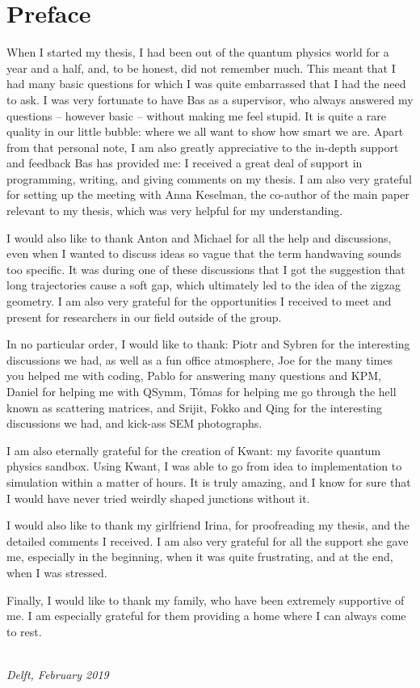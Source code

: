 \chapter*{Preface}

When I started my thesis, I had been out of the quantum physics world for a year and a half, and, to be honest, did not remember much.
This meant that I had many basic questions for which I was quite embarrassed that I had the need to ask.
I was very fortunate to have Bas as a supervisor, who always answered my questions -- however basic -- without making me feel stupid.
It is quite a rare quality in our little bubble: where we all want to show how smart we are.
Apart from that personal note, I am also greatly appreciative to the in-depth support and feedback Bas has provided me: I received a great deal of support in programming, writing, and giving comments on my thesis.
I am also very grateful for setting up the meeting with Anna Keselman, the co-author of the main paper relevant to my thesis, which was very helpful for my understanding.

I would also like to thank Anton and Michael for all the help and discussions, even when I wanted to discuss ideas so vague that the term handwaving sounds too specific.
It was during one of these discussions that I got the suggestion that long trajectories cause a soft gap, which ultimately led to the idea of the zigzag geometry.
I am also very grateful for the opportunities I received to meet and present for researchers in our field outside of the group.

In no particular order, I would like to thank:
Piotr and Sybren for the interesting discussions we had, as well as a fun office atmosphere,
Joe for the many times you helped me with coding, Pablo for answering many questions and KPM, Daniel for helping me with QSymm, Tómas for helping me go through the hell known as scattering matrices, and Srijit, Fokko and Qing for the interesting discussions we had, and kick-ass SEM photographs.

I am also eternally grateful for the creation of Kwant: my favorite quantum physics sandbox.
Using Kwant, I was able to go from idea to implementation to simulation within a matter of hours.
It is truly amazing, and I know for sure that I would have never tried weirdly shaped junctions without it. 

I would also like to thank my girlfriend Irina, for proofreading my thesis, and the detailed comments I received.
I am also very grateful for all the support she gave me, especially in the beginning, when it was quite frustrating, and at the end, when I was stressed.

Finally, I would like to thank my family, who have been extremely supportive of me.
I am especially grateful for them providing a home where I can always come to rest.

\begin{flushright}
{\makeatletter\itshape
    \@author \\
    Delft, February 2019
\makeatother}
\end{flushright}

